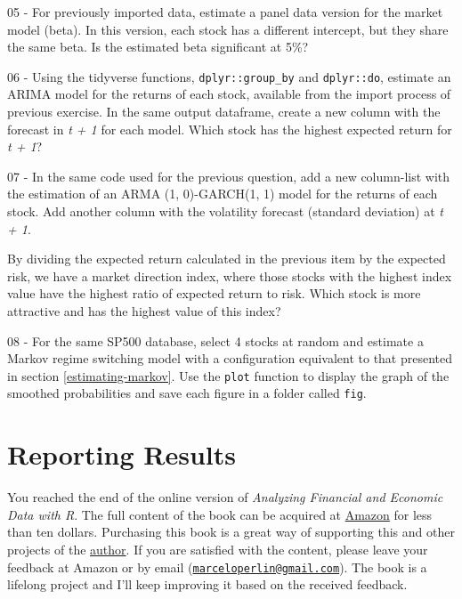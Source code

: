 \documentclass[
  12pt,
]{book}
\newenvironment{pleasebuyit}
{\begin{noteblock}
		
	} {\end{noteblock}}
\begin{document}
05 -
For previously imported data, estimate a panel data version for the market model (beta). In this version, each stock has a different intercept, but they share the same beta. Is the estimated beta significant at 5\%?

06 -
Using the tidyverse functions, \texttt{dplyr::group\_by} and \texttt{dplyr::do}, estimate an ARIMA model for the returns of each stock, available from the import process of previous exercise. In the same output dataframe, create a new column with the forecast in \emph{t + 1} for each model. Which stock has the highest expected return for \emph{t + 1}?

07 -
In the same code used for the previous question, add a new column-list with the estimation of an ARMA (1, 0)-GARCH(1, 1) model for the returns of each stock. Add another column with the volatility forecast (standard deviation) at \emph{t + 1}.

By dividing the expected return calculated in the previous item by the expected risk, we have a market direction index, where those stocks with the highest index value have the highest ratio of expected return to risk. Which stock is more attractive and has the highest value of this index?

08 -
For the same SP500 database, select 4 stocks at random and estimate a Markov regime switching model with a configuration equivalent to that presented in section \ref{estimating-markov}. Use the \texttt{plot} function to display the graph of the smoothed probabilities and save each figure in a folder called \texttt{\textquotesingle{}fig\textquotesingle{}}.

\hypertarget{reporting}{%
\chapter{Reporting Results}\label{reporting}}

\begin{pleasebuyit}
You reached the end of the online version of \emph{Analyzing Financial
and Economic Data with R}. The full content of the book can be acquired
at \href{https://www.amazon.com/dp/B084LSNXMN}{Amazon} for less than ten
dollars. Purchasing this book is a great way of supporting this and
other projects of the \href{https://www.msperlin.com/blog/}{author}. If
you are satisfied with the content, please leave your feedback at Amazon
or by email
(\href{mailto:marceloperlin@gmail.com}{\nolinkurl{marceloperlin@gmail.com}}).
The book is a lifelong project and I'll keep improving it based on the
received feedback.
\end{pleasebuyit}
\end{document}

